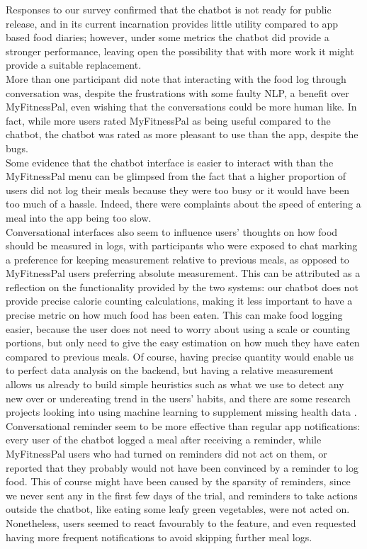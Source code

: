 Responses to our survey confirmed that the chatbot is not ready for public release, and in its current incarnation provides little utility compared to app based food diaries; however, under some metrics the chatbot did provide a stronger performance, leaving open the possibility that with more work it might provide a suitable replacement. \\
More than one participant did note that interacting with the food log through conversation was, despite the frustrations with some faulty NLP, a benefit over MyFitnessPal, even wishing that the conversations could be more human like. In fact, while more users rated MyFitnessPal as being useful compared to the chatbot, the chatbot was rated as more pleasant to use than the app, despite the bugs. \\
Some evidence that the chatbot interface is easier to interact with than the MyFitnessPal menu can be glimpsed from the fact that a higher proportion of users did not log their meals because they were too busy or it would have been too much of a hassle. Indeed, there were complaints about the speed of entering a meal into the app being too slow.\\
Conversational interfaces also seem to influence users' thoughts on how food should be measured in logs, with participants who were exposed to chat marking a preference for keeping measurement relative to previous meals, as opposed to MyFitnessPal users preferring absolute measurement. This can be attributed as a reflection on the functionality provided by the two systems: our chatbot does not provide precise calorie counting calculations, making it less important to have a precise metric on how much food has been eaten. This can make food logging easier, because the user does not need to worry about using a scale or counting portions, but only need to give the easy estimation on how much they have eaten compared to previous meals. Of course, having precise quantity would enable us to perfect data analysis on the backend, but having a relative measurement allows us already to build simple heuristics such as what we use to detect any new over or undereating trend in the users' habits, and there are some research projects looking into using machine learning to supplement missing health data \cite{wolters}. \\
Conversational reminder seem to be more effective than regular app notifications: every user of the chatbot logged a meal after receiving a reminder, while MyFitnessPal users who had turned on reminders did not act on them, or reported that they probably would not have been convinced by a reminder to log food. This of course might have been caused by the sparsity of reminders, since we never sent any in the first few days of the trial, and reminders to take actions outside the chatbot, like eating some leafy green vegetables, were not acted on. Nonetheless, users seemed to react favourably to the feature, and even requested having more frequent notifications to avoid skipping further meal logs. 

